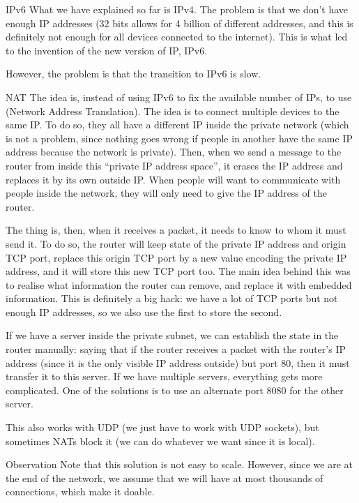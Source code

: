 \documentclass[a4paper]{article}
\begin{document}
\begin{parag}{IPv6}
    What we have explained so far is IPv4. The problem is that we don't have enough IP addresses (32 bits allows for 4 billion of different addresses, and this is definitely not enough for all devices connected to the internet). This is what led to the invention of the new version of IP, IPv6. 

    However, the problem is that the transition to IPv6 is slow. 
\end{parag}


\begin{parag}{NAT}
    The idea is, instead of using IPv6 to fix the available number of IPs, to use  (Network Address Translation). The idea is to connect multiple devices to the same IP. To do so, they all have a different IP inside the private network (which is not a problem, since nothing goes wrong if people in another have the same IP address because the network is private). Then, when we send a message to the router from inside this ``private IP address space'', it erases the IP address and replaces it by its own outside IP. When people will want to communicate with people inside the network, they will only need to give the IP address of the router.

    The thing is, then, when it receives a packet, it needs to know to whom it must send it. To do so, the router will keep state of the private IP address and origin TCP port, replace this origin TCP port by a new value encoding the private IP address, and it will store this new TCP port too. The main idea behind this was to realise what information the router can remove, and replace it with embedded information. This is definitely a big hack: we have a lot of TCP ports but not enough IP addresses, so we also use the first to store the second.

    If we have a server inside the private subnet, we can establish the state in the router manually: saying that if the router receives a packet with the router's IP address (since it is the only visible IP address outside) but port 80, then it must transfer it to this server. If we have multiple servers, everything gets more complicated. One of the solutions is to use an alternate port $8080$ for the other server. 

    This also works with UDP (we just have to work with UDP sockets), but sometimes NATs block it (we can do whatever we want since it is local).

    \begin{subparag}{Observation}
        Note that this solution is not easy to scale. However, since we are at the end of the network, we assume that we will have at most thousands of connections, which make it doable.
    \end{subparag}


\end{parag}
\end{document}
